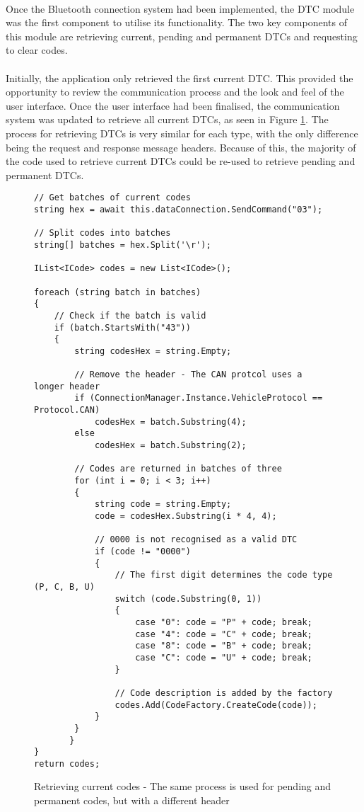 	\paragraph{}{
	Once the Bluetooth connection system had been implemented, the DTC module was the first component to utilise its functionality. The two key components of this module are retrieving current, pending and permanent DTCs and requesting to clear codes.
	}
	\paragraph{}{
	Initially, the application only retrieved the first current DTC. This provided the opportunity to review the communication process and the look and feel of the user interface. Once the user interface had been finalised, the communication system was updated to retrieve all current DTCs, as seen in Figure \ref{code:DTCModuleCodes}. The process for retrieving DTCs is very similar for each type, with the only difference being the request and response message headers. Because of this, the majority of the code used to retrieve current DTCs could be re-used to retrieve pending and permanent DTCs.
	}
	
	\begin{figure}[h]
		\begin{lstlisting}
// Get batches of current codes
string hex = await this.dataConnection.SendCommand("03");

// Split codes into batches
string[] batches = hex.Split('\r');

IList<ICode> codes = new List<ICode>();

foreach (string batch in batches)
{
	// Check if the batch is valid
    if (batch.StartsWith("43"))
    {        
        string codesHex = string.Empty;
        		
		// Remove the header - The CAN protcol uses a longer header
		if (ConnectionManager.Instance.VehicleProtocol == Protocol.CAN)
			codesHex = batch.Substring(4);
        else
			codesHex = batch.Substring(2);

        // Codes are returned in batches of three
		for (int i = 0; i < 3; i++)
		{
			string code = string.Empty;
			code = codesHex.Substring(i * 4, 4);

			// 0000 is not recognised as a valid DTC
			if (code != "0000")
			{
				// The first digit determines the code type (P, C, B, U)
				switch (code.Substring(0, 1))
				{
					case "0": code = "P" + code; break;
					case "4": code = "C" + code; break;
					case "8": code = "B" + code; break;
					case "C": code = "U" + code; break;						
				}					
				
				// Code description is added by the factory
				codes.Add(CodeFactory.CreateCode(code));
			}
		}
       }
}
return codes;
		\end{lstlisting}
		\caption{Retrieving current codes - The same process is used for pending and permanent codes, but with a different header}
		\label{code:DTCModuleCodes}
	\end{figure}
			

